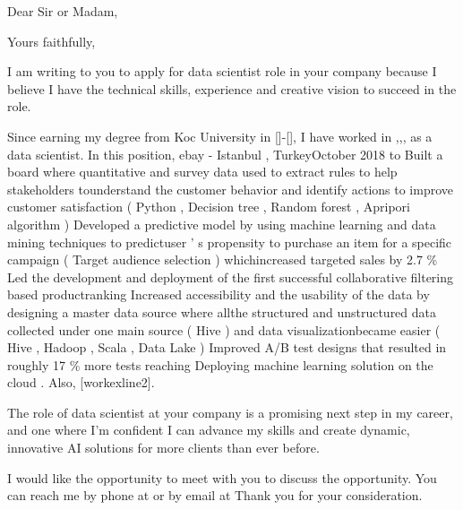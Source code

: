 \documentclass[11pt,a4paper,sans]{moderncv}        %
\begin{document}
\recipient{\quad}{\quad}
\date{February 07 2020}
\opening{Dear Sir or Madam,}
\closing{Yours faithfully,}
\makelettertitle

I am writing to you to apply for data scientist role in your company because I believe I have the technical skills, experience and creative vision to succeed in the role.



Since earning my degree from Koc University  in []-[], I have worked in ,,, as a data scientist. In this position, ebay - Istanbul , TurkeyOctober 2018 to Built a board where quantitative and survey data used to extract rules to help stakeholders tounderstand the customer behavior and identify actions to improve customer satisfaction ( Python , Decision tree , Random forest , Apripori algorithm ) Developed a predictive model by using machine learning and data mining techniques to predictuser ’ s propensity to purchase an item for a specific campaign ( Target audience selection ) whichincreased targeted sales by 2.7 \% Led the development and deployment of the first successful collaborative filtering based productranking Increased accessibility and the usability of the data by designing a master data source where allthe structured and unstructured data collected under one main source ( Hive ) and data visualizationbecame easier ( Hive , Hadoop , Scala , Data Lake ) Improved A/B test designs that resulted in roughly 17 \% more tests reaching Deploying machine learning solution on the cloud . Also, [workexline2]. 

The role of data scientist at your company is a promising next step in my career, and one where I’m confident I can advance my skills and create dynamic, innovative AI solutions for more clients than ever before.


I would like the opportunity to meet with you to discuss the opportunity. You can reach me by phone at  or by email at 
Thank you for your consideration.


\makeletterclosing
\end{document}
